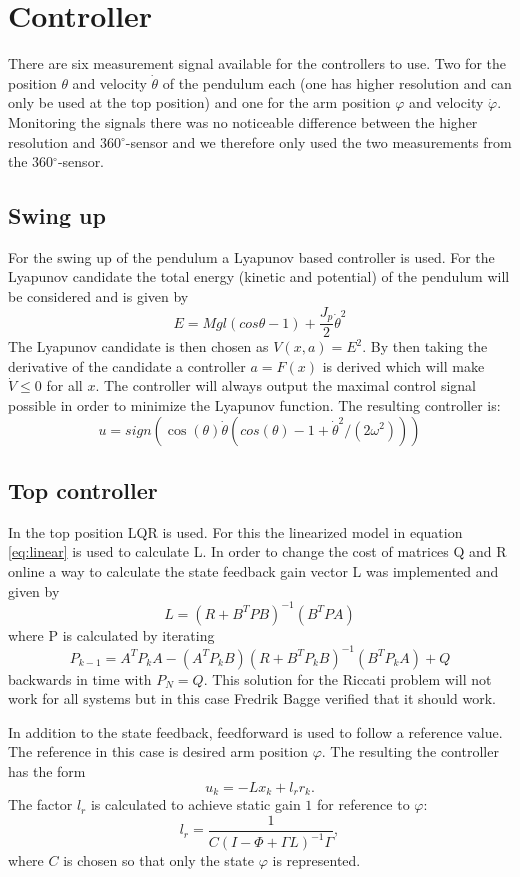 \documentclass[10pt,a4paper]{article}
\begin{document}
\section{Controller}
There are six measurement signal available for the controllers to use. Two for the position $ \theta $ and velocity $ \dot{\theta} $ of the pendulum each (one has higher resolution and can only  be used at the top position) and one for the arm position $ \varphi $ and velocity $ \dot{\varphi} $. Monitoring the signals there was no noticeable difference between the higher resolution and $ 360{^\circ} $-sensor and we therefore only used the two measurements from the $ 360 {^\circ} $-sensor.
\subsection{Swing up}
For the swing up of the pendulum a Lyapunov based controller is used. For the Lyapunov candidate the total energy (kinetic and potential) of the pendulum will be considered and is given by 
\begin{equation}
E= Mgl(cos\theta - 1)+\frac{J_p}{2}\dot\theta^2
\label{eq:energy}
\end{equation}
The Lyapunov candidate is then chosen as $V(x,a)=E^2$. By then taking the derivative of the candidate a controller $a=F(x)$ is derived which will make $\dot V \leq 0$ for all $x$. The controller will always output the maximal control signal possible in order to minimize the Lyapunov function. The resulting controller is:
\begin{equation}
u = sign( \cos(\theta) \dot\theta (cos(\theta) - 1 + \dot{\theta}^2 / (2 \omega^2)))
\end{equation}
\subsection{Top controller}
In the top position LQR is used. For this the linearized model in equation \eqref{eq:linear} is used to calculate L. In order to change the cost of matrices Q and R online a way to calculate the state feedback gain vector L was implemented and given by
$$ L = (R+B^TPB)^{-1}(B^TPA) $$
where P is calculated by iterating
$$ P_{k-1} = A^TP_kA-(A^TP_kB)(R+B^TP_kB)^{-1}(B^TP_kA)+Q $$
backwards in time with $P_N = Q$. This solution for the Riccati problem will not work for all systems but in this case Fredrik Bagge verified that it should work.

In addition to the state feedback, feedforward is used to follow a reference value. The reference in this case is desired arm position $\varphi$. The resulting the controller has the form
\begin{equation}
u_k = -Lx_k + l_rr_k.
\end{equation}
The factor $l_r$ is calculated to achieve static gain $1$ for reference to $\varphi$:
\begin{equation}
l_r = \frac{1}{C(I - \Phi + \Gamma L)^{-1}\Gamma},
\end{equation}
where $C$ is chosen so that only the state $\varphi$ is represented.
\end{document}
